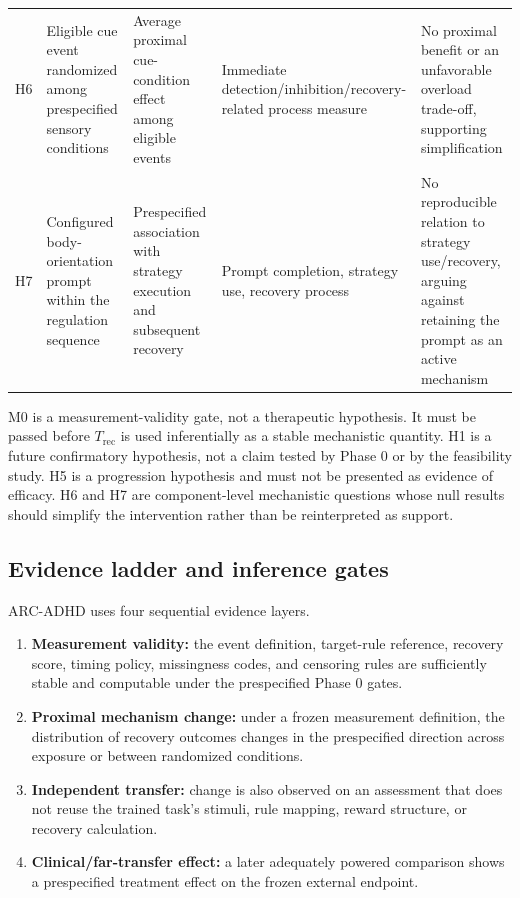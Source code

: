 \begin{longtable}{p{0.8cm}p{2.5cm}p{2.5cm}p{2.5cm}p{3.0cm}}
H6 & Eligible cue event randomized among prespecified sensory conditions & Average proximal cue-condition effect among eligible events & Immediate detection/\allowbreak inhibition/\allowbreak recovery-related process measure & No proximal benefit or an unfavorable overload trade-off, supporting simplification \\
H7 & Configured body-orientation prompt within the regulation sequence & Prespecified association with strategy execution and subsequent recovery & Prompt completion, strategy use, recovery process & No reproducible relation to strategy use/\allowbreak recovery, arguing against retaining the prompt as an active mechanism \\
\end{longtable}
\endgroup

M0 is a measurement-validity gate, not a therapeutic hypothesis. It must be passed before \(T_{\mathrm{rec}}\) is used inferentially as a stable mechanistic quantity. H1 is a future confirmatory hypothesis, not a claim tested by Phase 0 or by the feasibility study. H5 is a progression hypothesis and must not be presented as evidence of efficacy. H6 and H7 are component-level mechanistic questions whose null results should simplify the intervention rather than be reinterpreted as support.

\subsection{Evidence ladder and inference gates}

ARC-ADHD uses four sequential evidence layers.

\begin{enumerate}
\item \textbf{Measurement validity:} the event definition, target-rule reference, recovery score, timing policy, missingness codes, and censoring rules are sufficiently stable and computable under the prespecified Phase 0 gates.
\item \textbf{Proximal mechanism change:} under a frozen measurement definition, the distribution of recovery outcomes changes in the prespecified direction across exposure or between randomized conditions.
\item \textbf{Independent transfer:} change is also observed on an assessment that does not reuse the trained task's stimuli, rule mapping, reward structure, or recovery calculation.
\item \textbf{Clinical/far-transfer effect:} a later adequately powered comparison shows a prespecified treatment effect on the frozen external endpoint.
\end{enumerate}

